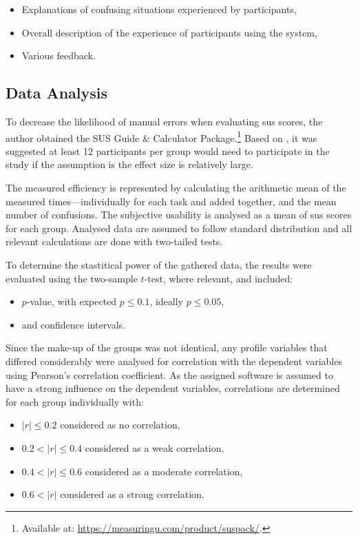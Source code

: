 \begin{itemize}
    \item Explanations of confusing situations experienced by participants,
    \item Overall description of the experience of participants using the system,
    \item Various feedback.
\end{itemize}

\subsection{Data Analysis}
\label{sec:methodology-data-analysis}

To decrease the likelihood of manual errors when evaluating \gls{sus} scores, the author obtained the SUS Guide \& Calculator Package.\footnote{Available at: \url{https://measuringu.com/product/suspack/}.}
Based on , it was suggested at least 12 participants per group would need to participate in the study if the assumption is the effect size is relatively large.

The measured efficiency is represented by calculating the arithmetic mean of the measured times---individually for each task and added together, and the mean number of confusions.
The subjective usability is analysed as a mean of \gls{sus} scores for each group.
Analysed data are assumed to follow standard distribution and all relevant calculations are done with two-tailed tests.

To determine the stastitical power of the gathered data, the results were evaluated using the two-sample $t$-test, where relevant, and included:

\begin{itemize}
    \item $p$-value, with expected $p \leq 0.1 $, ideally $p \leq 0.05 $,
    \item and confidence intervals.
\end{itemize}

Since the make-up of the groups was not identical, any profile variables that differed considerably were analysed for correlation with the dependent variables using Pearson's correlation coefficient.
As the assigned software is assumed to have a strong influence on the dependent variables, correlations are determined for each group individually with:

\begin{itemize}
    \item $|r| \le 0.2$ considered as no correlation,
    \item $0.2 < |r| \le 0.4$ considered as a weak correlation,
    \item $0.4 < |r| \le 0.6$ considered as a moderate correlation,
    \item $0.6 < |r|$ considered as a strong correlation.
\end{itemize}

